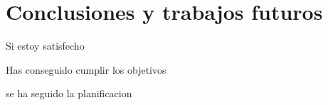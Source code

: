 \chapter{Conclusiones y trabajos futuros}

Si estoy satisfecho

Has conseguido cumplir los objetivos

se ha seguido la planificacion

